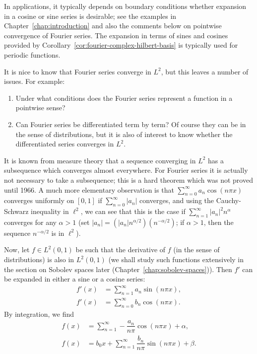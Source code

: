 In applications, it typically depends on boundary conditions whether expansion in a cosine or sine series is desirable; see the examples in Chapter~\ref{chap:introduction} and also the comments below on pointwise convergence of Fourier series. The expansion in terms of sines and cosines provided by Corollary~\ref{cor:fourier-complex-hilbert-basis} is typically used for periodic functions.

It is nice to know that Fourier series converge in $L^2$, but this leaves a number of issues. For example:\begin{enumerate}
\item Under what conditions does the Fourier series represent a function in a pointwise sense?
\item Can Fourier series be differentiated term by term? Of course they can be in the sense of distributions, but it is also of interest to know whether the differentiated series converges in $L^2$.
\end{enumerate}

It is known from measure theory that a sequence converging in $L^2$ has a subsequence which converges almost everywhere. For Fourier series it is actually not necessary to take a subsequence; this is a hard theorem which was not proved until 1966. A much more elementary observation is that $\sum_{n=0}^\infty a_n\cos(n\pi x)$ converges uniformly on $[0,1]$ if $\sum_{n=0}^\infty|a_n|$ converges, and using the Cauchy-Schwarz inequality in $\ell^2$, we can see that this is the case if $\sum_{n=1}^\infty|a_n|^2n^\alpha$ converges for any $\alpha>1$ (set $|a_n|=(|a_n|n^{\alpha/2})(n^{-\alpha/2})$; if $\alpha>1$, then the sequence $n^{-\alpha/2}$ is in $\ell^2$).

Now, let $f\in L^2(0,1)$ be such that the derivative of $f$ (in the sense of distributions) is also in $L^2(0,1)$ (we shall study such functions extensively in the section on Sobolev spaces later (Chapter~\ref{chap:sobolev-spaces})). Then $f'$ can be expanded in either a sine or a cosine series:
\begin{equation}\label{eq:fourier-derivative-sine-cosine-expansions}
\begin{aligned}
f'(x)&=\sum_{n=1}^\infty a_n\sin(n\pi x),\\
f'(x)&=\sum_{n=0}^\infty b_n\cos(n\pi x).
\end{aligned}
\end{equation}
By integration, we find
\begin{equation}\label{eq:fourier-antiderivative-cosine-sine-expansions}
\begin{aligned}
f(x)&=\sum_{n=1}^\infty-\dfrac{a_n}{n\pi}\cos(n\pi x)+\alpha,\\
f(x)&=b_0x+\sum_{n=1}^\infty\dfrac{b_n}{n\pi}\sin(n\pi x)+\beta.
\end{aligned}
\end{equation}


